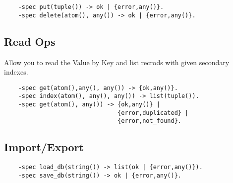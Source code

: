 \vspace{1\baselineskip}
\begin{lstlisting}
    -spec put(tuple()) -> ok | {error,any()}.
    -spec delete(atom(), any()) -> ok | {error,any()}.
\end{lstlisting}
\vspace{1\baselineskip}

\subsection{Read Ops}
Allow you to read the Value by Key and list
recrods with given secondary indexes.

\vspace{1\baselineskip}
\begin{lstlisting}
    -spec get(atom(),any(), any()) -> {ok,any()}.
    -spec index(atom(), any(), any()) -> list(tuple()).
    -spec get(atom(), any()) -> {ok,any()} | 
                                {error,duplicated} |
                                {error,not_found}.
\end{lstlisting}
\vspace{1\baselineskip}

\subsection{Import/Export}

\vspace{1\baselineskip}
\begin{lstlisting}
    -spec load_db(string()) -> list(ok | {error,any()}).
    -spec save_db(string()) -> ok | {error,any()}.
\end{lstlisting}
\vspace{1\baselineskip}
